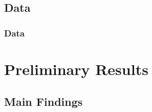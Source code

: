 \documentclass[11pt, aspectratio=1610, xcolor={dvipsnames}]{beamer}
\begin{document}
	\subsection{Data}
	\begin{frame}
		\frametitle{Data}
	\end{frame}
	
	\section{Preliminary Results}
	\begin{frame}
		\frametitle{}
	\end{frame}
	
	\subsection{Main Findings}
\end{document}
